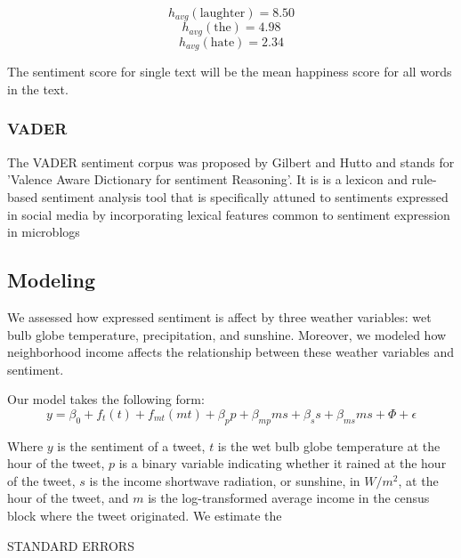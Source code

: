 \documentclass{article}
\begin{document}
\[h_{avg} (\text{laughter}) = 8.50 \]
\[h_{avg} (\text{the}) = 4.98\]
\[h_{avg} (\text{hate}) = 2.34\]

The sentiment score for single text will be the mean happiness score for all words in the text.


\subsubsection{VADER}
The VADER sentiment corpus was proposed by Gilbert and Hutto \cite{gilbert_vader_2014} and stands for 'Valence Aware Dictionary for sentiment Reasoning'. It is is a lexicon and rule-based sentiment analysis tool that is specifically attuned to sentiments expressed in social media by incorporating lexical features common to sentiment expression in microblogs

\subsection{Modeling}
We assessed how expressed sentiment is affect by three weather variables: wet bulb globe temperature, precipitation, and sunshine.  Moreover, we modeled how neighborhood income affects the relationship between these weather variables and sentiment.

Our model takes the following form:
\begin{equation}
    y = \beta_0 + f_t(t) + f_{mt}(m t) + \beta_p p + \beta_{mp} m s + \beta_s s + \beta_{ms} m s + \Phi + \epsilon
\end{equation}

Where $y$ is the sentiment of a tweet, $t$ is the wet bulb globe temperature at the hour of the tweet, $p$ is a binary variable indicating whether it rained at the hour of the tweet, $s$ is the income shortwave radiation, or sunshine, in $W/m^2$, at the hour of the tweet, and $m$ is the log-transformed average income in the census block where the tweet originated.  We estimate the 


STANDARD ERRORS
\end{document}
